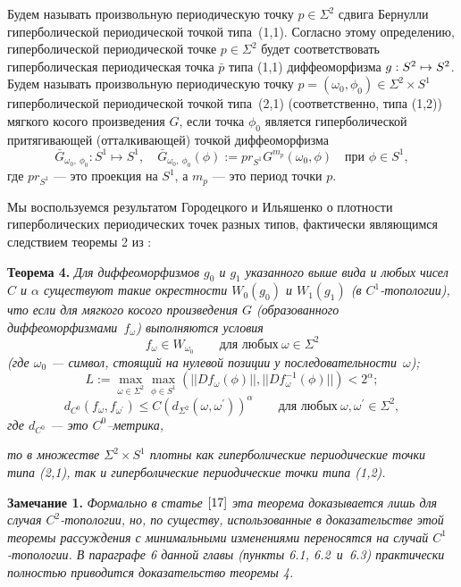 \documentclass[12pt]{article}
\begin{document}
Будем называть произвольную периодическую точку $p\in\Sigma^2$ сдвига Бернулли гиперболической периодической точкой типа~(1,1). Согласно этому определению, гиперболической периодической точке $p\in\Sigma^2$ будет соответствовать гиперболическая периодическая точка $\bar{p}$ типа (1,1) диффеоморфизма $g\nobreak:\nobreak S^2\mapsto S^2$.
Будем называть произвольную периодическую точку $p=(\omega_0,\phi_0)\in\Sigma^2\times S^1$ гиперболической периодической точкой типа~(2,1) (соответственно, типа (1,2)) мягкого косого произведения $G$, если точка $\phi_0$ является гиперболической притягивающей (отталкивающей) точкой диффеоморфизма
 $$\bar{G}_{\omega_0,\ \phi_0}:S^1\mapsto S^1,\quad \bar{G}_{\omega_0,\ \phi_0}(\phi):=pr_{S^1}G^{m_p}(\omega_0,\phi)\quad\mbox{при }\phi\in S^1,$$
где $pr_{S^1}$ --- это проекция на $S^1$, а $m_p$ --- это период точки $p$.

Мы воспользуемся результатом Городецкого и Ильяшенко о 
плотности гиперболических периодических точек разных типов, фактически являющимся следствием теоремы 2 из \cite{17}:

\textbf{Теорема 4.}\textit{
Для диффеоморфизмов $g_0$ и $g_1$ указанного выше вида и любых чисел $C$ и $\alpha$ существуют такие окрестности $W_0(g_0)$ и $W_1(g_1)$ (в $C^1$-топологии), что если для мягкого косого произведения $G$ (образованного диффеоморфизмами~$f_{\omega}$) выполняются условия
\begin{equation}
\label{2.2.3}
f_{\omega}\in W_{\omega_0}\qquad\textrm{для любых}\ \omega\in\Sigma^2
\end{equation}
(где $\omega_0$ --- символ, стоящий на нулевой позиции у последовательности~$\omega$);
\begin{equation}
\label{2.2.4}
L:=\max_{\omega\in\Sigma^2}\max_{\phi\in S^1}(||Df_{\omega}(\phi)||,||Df^{-1}_\omega(\phi)||)<2^{\alpha};
\end{equation}
\begin{equation}
\label{2.2.5}
d_{C^0}(f_{\omega},f_{\omega^\prime})\leq C(d_{\Sigma^2}(\omega,\omega^\prime))^{\alpha}\qquad\textrm{для любых}\ \omega,\omega^\prime\in\Sigma^2,
\end{equation}
где $d_{C^0}$ --- это $C^0$--метрика,}

\textit{то в множестве $\Sigma^2\times S^1$ плотны как гиперболические периодические точки типа (2,1), так и гиперболические периодические точки типа (1,2).}

\textbf{Замечание 1.} \textit{Формально в статье $\cite{17}$ эта теорема доказывается лишь для случая $C^2$-топологии, но, по существу, использованные в доказательстве этой теоремы рассуждения с минимальными изменениями переносятся на случай $C^1$-топологии. В параграфе 6 данной главы (пункты 6.1, 6.2~и~6.3) практически полностью приводится доказательство теоремы 4.}
\end{document}
